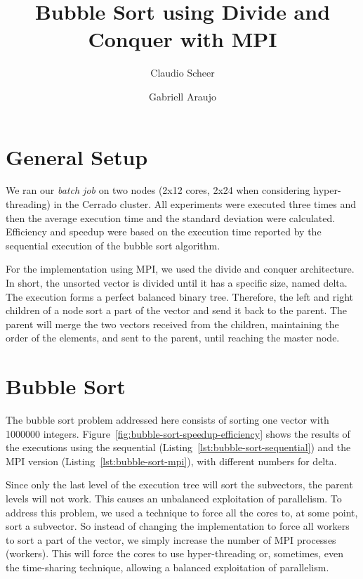 \documentclass[10pt,twocolumn]{article}
\begin{document}
\title{\vspace{-1cm}Bubble Sort using Divide and Conquer with MPI}
\author[1]{Claudio Scheer}
\author[1]{Gabriell Araujo}
\date{}

\maketitle

\section*{General Setup}
We ran our \textit{batch job} on two nodes (2x12 cores, 2x24 when considering hyper-threading) in the Cerrado cluster. All experiments were executed three times and then the average execution time and the standard deviation were calculated. Efficiency and speedup were based on the execution time reported by the sequential execution of the bubble sort algorithm.

For the implementation using MPI, we used the divide and conquer architecture. In short, the unsorted vector is divided until it has a specific size, named delta. The execution forms a perfect balanced binary tree. Therefore, the left and right children of a node sort a part of the vector and send it back to the parent. The parent will merge the two vectors received from the children, maintaining the order of the elements, and sent to the parent, until reaching the master node.

\section*{Bubble Sort}
The bubble sort problem addressed here consists of sorting one vector with 1000000 integers. Figure~\ref{fig:bubble-sort-speedup-efficiency} shows the results of the executions using the sequential (Listing~\ref{lst:bubble-sort-sequential}) and the MPI version (Listing~\ref{lst:bubble-sort-mpi}), with different numbers for delta.

Since only the last level of the execution tree will sort the subvectors, the parent levels will not work. This causes an unbalanced exploitation of parallelism. To address this problem, we used a technique to force all the cores to, at some point, sort a subvector. So instead of changing the implementation to force all workers to sort a part of the vector, we simply increase the number of MPI processes (workers). This will force the cores to use hyper-threading or, sometimes, even the time-sharing technique, allowing a balanced exploitation of parallelism.
\end{document}
